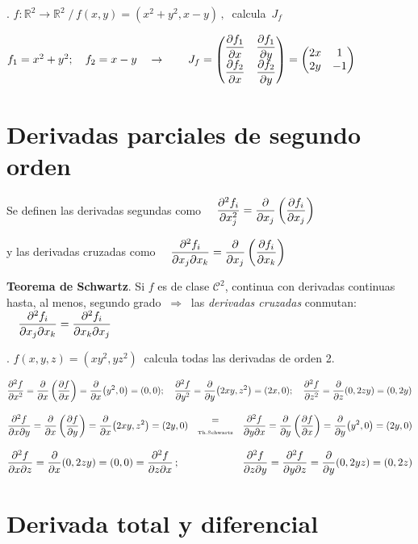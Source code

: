 \begin{example}
.	$f:\mathbb R^2 \to \mathbb R^2 \; / \, f(x,y)=(x^2+y^2,x-y)\, , \ $	 calcula $\, J_f$
\end{example}


$f_1=x^2+y^2;\quad f_2=x-y \quad \to \qquad J_f=\mqty( \displaystyle \pdv{f_1}{x} &  \displaystyle \pdv{f_1}{y} \\  \displaystyle \pdv{f_2}{x} &  \displaystyle \pdv{f_2}{y} )= \mqty( 2x & 1 \\ 2y & -1 )$

\section{Derivadas parciales de segundo orden}

Se definen las derivadas segundas como $\quad \displaystyle \pdv[2]{f_i}{x_j}=\pdv{x_j} \left( \pdv{f_i}{x_j} \right) \ $  

y las derivadas cruzadas como $\quad  \displaystyle \pdv[2]{f_i}{x_j}{x_k}=\pdv{x_j} \left( \pdv{f_i}{x_k} \right)$

\textbf{Teorema de Schwartz}. Si $f$ es de clase $\mathcal C^2$, continua con derivadas continuas hasta, al menos, segundo grado $\ \Rightarrow \ $ las \emph{derivadas cruzadas} conmutan: $\quad  \displaystyle \pdv[2]{f_i}{x_j}{x_k}= \pdv[2]{f_i}{x_k}{x_j}$

\begin{example}
.	$f(x,y,z)=(xy^2,yz^2)\ $	calcula todas las derivadas de orden 2.
\end{example}

$\displaystyle \pdv[2]{f}{x}=\pdv{x}\left(\pdv{f}{x}\right)=\pdv{x}(y^2,0)=(0,0);\quad \pdv[2]{f}{y}=\pdv{y}(2xy,z^2)=(2x,0); \quad \pdv[2]{f}{z}=\pdv{z}(0,2zy)=(0,2y)$

$\displaystyle \pdv[2]{f}{x}{y}=\pdv{x} \left( \pdv{f}{y} \right) = \pdv{x} (2xy,z^2)=(2y,0) \quad  \mqty{ = \\ \text{\tiny{Th.Schwartz}} } \quad \pdv[2]{f}{y}{x}=\pdv{y} \left( \pdv{f}{x} \right) = \pdv{y} (y^2,0)=(2y,0)$

$\displaystyle \pdv[2]{f}{x}{z}=\pdv{x}(0,2zy)=(0,0)=\pdv[2]{f}{z}{x}\, ;  \qquad  \qquad \qquad \pdv[2]{f}{z}{y}= \pdv[2]{f}{y}{z}=\pdv{y}(0,2yz)=(0,2z)$

\section{Derivada total y diferencial}

